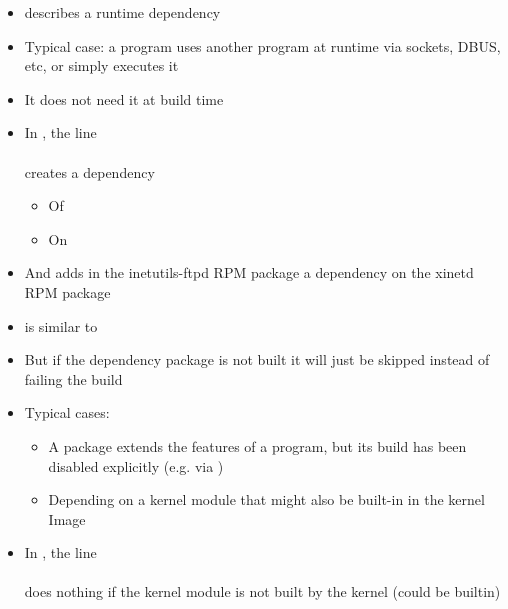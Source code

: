 \begin{frame}{}
  \begin{itemize}
    \item {} describes a runtime dependency
    \item Typical case: a program uses another program at runtime via
      sockets, DBUS, etc, or simply executes it
    \item It does not need it at build time
    \item In , the line\\
      \\
      creates a dependency
      \begin{itemize}
      \item Of 
      \item On 
      \end{itemize}
    \item And adds in the inetutils-ftpd RPM package a dependency on
      the xinetd RPM package
  \end{itemize}
\end{frame}

\begin{frame}{}
  \begin{itemize}
    \item {} is similar to 
    \item But if the dependency package is not built it will just be
      skipped instead of failing the build
    \item Typical cases:
      \begin{itemize}
        \item A package extends the features of a program, but its build
          has been disabled explicitly (e.g. via )
        \item Depending on a kernel module that might also be built-in in
          the kernel Image
      \end{itemize}
    \item In , the line\\
      \\
      does nothing if the  kernel module is not built by
      the kernel (could be builtin)
  \end{itemize}
\end{frame}
